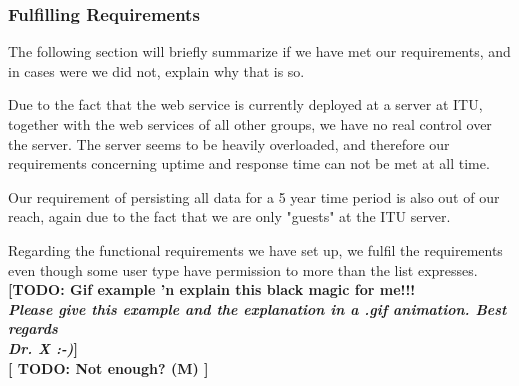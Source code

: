 \subsubsection{Fulfilling Requirements}
\label{serverfulfil}
The following section will briefly summarize if we have met our requirements, and in cases were we did not, explain why that is so.

Due to the fact that the web service is currently deployed at a server at ITU, together with the web services of all other groups, we have no real control over the server. The server seems to be heavily overloaded, and therefore our requirements concerning uptime and response time can not be met at all time.

Our requirement of persisting all data for a 5 year time period is also out of our reach, again due to the fact that we are only "guests" at the ITU server.

Regarding the functional requirements we have set up, we fulfil the requirements even though some user type have permission to more than the list expresses.
\textbf{[TODO: Gif example 'n explain this black magic for me!!! \\\textit{Please give this example and the explanation in a .gif animation. Best regards\\Dr. X :-)}]}\\
\textbf{[ TODO: Not enough? (M) ]}